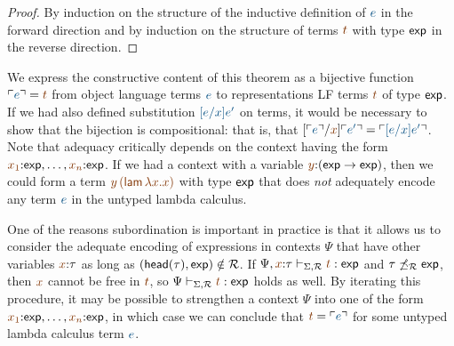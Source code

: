 \begin{proof}
By induction on the structure of the inductive definition of $\obj{e}$
in the forward direction and by induction on the structure of 
terms $\lf{t}$ with type ${\sf exp}$ in the reverse direction.
\end{proof}

We express the constructive content of this theorem as a bijective
function $\interp{e} = \lf{t}$ from object language terms $\obj{e}$ to
representations LF terms $\lf{t}$ of type ${\sf exp}$. If we had also
defined substitution $\obj{[e/x]e'}$ on terms, it would be necessary
to show that the bijection is compositional: that is, that
$[\interp{e}/\lf{x}]\interp{e'} = \interp{[e/x]e'}$.  Note that
adequacy critically depends on the context having the form
$\lf{x_1}{:}{\sf exp},\ldots,\lf{x_n}{:}{\sf exp}$. If we had a
context with a variable $\lf{y}{:}({\sf exp} \rightarrow {\sf exp})$,
then we could form a term $\lf{y\,({\sf lam}\,\lambda x. x)}$ with
type ${\sf exp}$ that does {\it not} adequately encode any term
$\obj{e}$ in the untyped lambda calculus.

One of the reasons subordination is important in practice is that it
allows us to consider the adequate encoding of expressions in contexts
$\Psi$ that have other variables $\lf{x}{:}\tau$ as long as $({\sf
  head}(\tau),{\sf exp}) \notin \mathcal R$. If $\Psi,\lf{x}{:}\tau
\vdash_{\Sigma,\subord} \lf{t} : {\sf exp}$ and $\tau
\not\preceq_\mathcal R {\sf exp}$, then $\lf{x}$ cannot be free in
$\lf{t}$, so $\Psi \vdash_{\Sigma,\subord} \lf{t} : {\sf exp}$ holds as
well. By iterating this procedure, it may be possible to strengthen a
context $\Psi$ into one of the form $\lf{x_1}{:}{\sf
  exp},\ldots,\lf{x_n}{:}{\sf exp}$, in which case we can conclude
that $\lf t = \interp{e}$ for some untyped lambda calculus term $\obj
e$.

